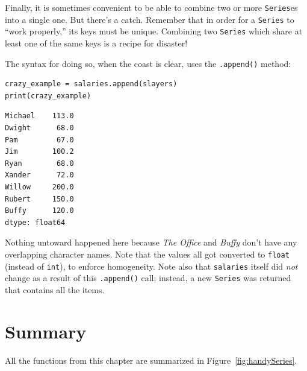 Finally, it is sometimes convenient to be able to combine two or more
\texttt{Series}es into a single one. But there's a catch. Remember that in
order for a \texttt{Series} to ``work properly,'' its keys must be unique.
Combining two \texttt{Series} which share at least one of the same keys is a
recipe for disaster!

The syntax for doing so, when the coast is clear, uses the \texttt{.append()}
method:

\begin{Verbatim}[fontsize=\small,samepage=true,frame=single,framesep=3mm]
crazy_example = salaries.append(slayers)
print(crazy_example)
\end{Verbatim}
\vspace{-.3in}

\begin{Verbatim}[fontsize=\small,samepage=true,frame=leftline,framesep=5mm,framerule=1mm]
Michael    113.0
Dwight      68.0
Pam         67.0
Jim        100.2
Ryan        68.0
Xander      72.0
Willow     200.0
Rubert     150.0
Buffy      120.0
dtype: float64
\end{Verbatim}

Nothing untoward happened here because \textit{The Office} and \textit{Buffy}
don't have any overlapping character names. Note that the values all got
converted to \texttt{float} (instead of \texttt{int}), to enforce homogeneity.
Note also that \texttt{salaries} itself did \textit{not} change as a result of
this \texttt{.append()} call; instead, a new \texttt{Series} was returned that
contains all the items.


\section{Summary}

All the functions from this chapter are summarized in
Figure~\ref{fig:handySeries}.

\setlength\extrarowheight{5pt}

